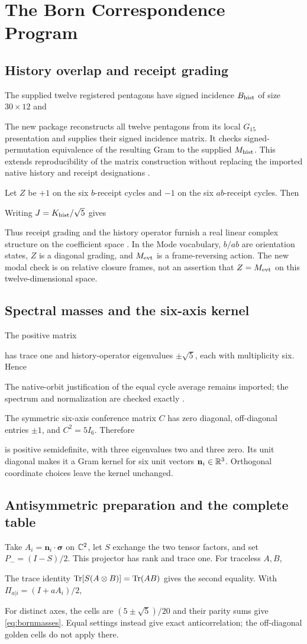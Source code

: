 \section{The Born Correspondence Program}\label{sec:born}
\subsection*{History overlap and receipt grading}
The supplied twelve registered pentagons have signed incidence $B_{\rm hist}$ of size $30\times12$ and

The new package reconstructs all twelve pentagons from its local $G_{15}$ presentation and supplies their signed incidence matrix. It checks signed-permutation equivalence of the resulting Gram to the supplied $M_{\rm hist}$. This extends reproducibility of the matrix construction without replacing the imported native history and receipt designations \citep{historyconference}.

Let $Z$ be $+1$ on the six $b$-receipt cycles and $-1$ on the six $ab$-receipt cycles. Then

Writing $J=K_{\rm hist}/\sqrt5$ gives

Thus receipt grading and the history operator furnish a real linear complex structure on the coefficient space \citep{historyclifford}. In the Mode vocabulary, $b/ab$ are orientation states, $Z$ is a diagonal grading, and $M_{\mathrm{evt}}$ is a frame-reversing action. The new modal check is on relative closure frames, not an assertion that $Z=M_{\mathrm{evt}}$ on this twelve-dimensional space.

\subsection*{Spectral masses and the six-axis kernel}
The positive matrix

has trace one and history-operator eigenvalues $\pm\sqrt5$, each with multiplicity six. Hence

The native-orbit justification of the equal cycle average remains imported; the spectrum and normalization are checked exactly \citep{historyclifford}.

The symmetric six-axis conference matrix $C$ has zero diagonal, off-diagonal entries $\pm1$, and $C^2=5I_6$. Therefore

is positive semidefinite, with three eigenvalues two and three zero. Its unit diagonal makes it a Gram kernel for six unit vectors $\mathbf n_i\in\mathbb R^3$. Orthogonal coordinate choices leave the kernel unchanged.

\subsection*{Antisymmetric preparation and the complete table}
Take $A_i=\mathbf n_i\cdot\boldsymbol\sigma$ on $\mathbb C^2$, let $S$ exchange the two tensor factors, and set $P_-=(I-S)/2$. This projector has rank and trace one. For traceless $A,B$,

The trace identity $\operatorname{Tr}[S(A\otimes B)]=\operatorname{Tr}(AB)$ gives the second equality. With $\Pi_{a|i}=(I+aA_i)/2$,

For distinct axes, the cells are $(5\pm\sqrt5)/20$ and their parity sums give \eqref{eq:bornmasses}. Equal settings instead give exact anticorrelation; the off-diagonal golden cells do not apply there.

